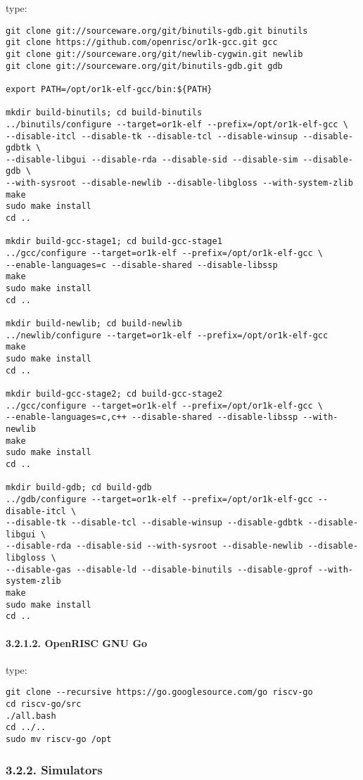 \documentclass[]{article}
\let\oldparagraph\paragraph
\renewcommand{\paragraph}[1]{\oldparagraph{#1}\mbox{}}
\begin{document}
type:

\begin{verbatim}
git clone git://sourceware.org/git/binutils-gdb.git binutils
git clone https://github.com/openrisc/or1k-gcc.git gcc
git clone git://sourceware.org/git/newlib-cygwin.git newlib
git clone git://sourceware.org/git/binutils-gdb.git gdb

export PATH=/opt/or1k-elf-gcc/bin:${PATH}

mkdir build-binutils; cd build-binutils
../binutils/configure --target=or1k-elf --prefix=/opt/or1k-elf-gcc \
--disable-itcl --disable-tk --disable-tcl --disable-winsup --disable-gdbtk \
--disable-libgui --disable-rda --disable-sid --disable-sim --disable-gdb \
--with-sysroot --disable-newlib --disable-libgloss --with-system-zlib
make
sudo make install
cd ..

mkdir build-gcc-stage1; cd build-gcc-stage1
../gcc/configure --target=or1k-elf --prefix=/opt/or1k-elf-gcc \
--enable-languages=c --disable-shared --disable-libssp
make
sudo make install
cd ..

mkdir build-newlib; cd build-newlib
../newlib/configure --target=or1k-elf --prefix=/opt/or1k-elf-gcc
make
sudo make install
cd ..

mkdir build-gcc-stage2; cd build-gcc-stage2
../gcc/configure --target=or1k-elf --prefix=/opt/or1k-elf-gcc \
--enable-languages=c,c++ --disable-shared --disable-libssp --with-newlib
make
sudo make install
cd ..

mkdir build-gdb; cd build-gdb
../gdb/configure --target=or1k-elf --prefix=/opt/or1k-elf-gcc --disable-itcl \
--disable-tk --disable-tcl --disable-winsup --disable-gdbtk --disable-libgui \
--disable-rda --disable-sid --with-sysroot --disable-newlib --disable-libgloss \
--disable-gas --disable-ld --disable-binutils --disable-gprof --with-system-zlib
make
sudo make install
cd ..
\end{verbatim}

\paragraph{3.2.1.2. OpenRISC GNU Go}\label{openrisc-gnu-go}

type:

\begin{verbatim}
git clone --recursive https://go.googlesource.com/go riscv-go
cd riscv-go/src
./all.bash
cd ../..
sudo mv riscv-go /opt
\end{verbatim}

\subsubsection{3.2.2. Simulators}\label{simulators}
\end{document}
